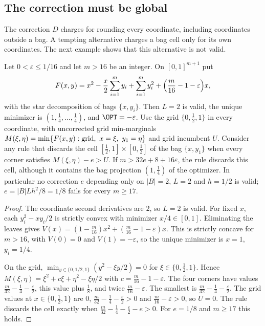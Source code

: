 \subsection{The correction must be global}\label{sec:limits-star}

The correction $D$ charges for rounding every coordinate, including
coordinates outside a bag. A tempting alternative charges a bag cell only for
its own coordinates. The next example shows that this alternative is not
valid.

\begin{proposition}\label{lim:prop:star}
Let $0<\varepsilon\le1/16$ and let $m>16$ be an integer. On $[0,1]^{m+1}$
put
\[
F(x,y)=x^2-\frac x2\sum_{i=1}^my_i+\sum_{i=1}^my_i^2
+\Bigl(\frac m{16}-1-\varepsilon\Bigr)x,
\]
with the star decomposition of bags $\{x,y_i\}$. Then $L=2$ is valid, the
unique minimizer is $(1,\tfrac14,\ldots,\tfrac14)$, and $\OPT=-\varepsilon$.
Use the grid $\{0,\tfrac12,1\}$ in every coordinate, with uncorrected grid
min-marginals
$M(\xi,\eta)=\min\{F(x,y):\hbox{grid},\ x=\xi,\ y_1=\eta\}$ and grid
incumbent $U$. Consider any rule that discards the cell
$[\tfrac12,1]\times[0,\tfrac12]$ of the bag $\{x,y_1\}$ when every corner
satisfies $M(\xi,\eta)-e>U$. If $m>32e+8+16\varepsilon$, the rule discards
this cell, although it contains the bag projection $(1,\tfrac14)$ of the
optimizer. In particular no correction $e$ depending only on $|B|=2$,
$L=2$ and $h=1/2$ is valid; $e=|B|Lh^2/8=1/8$ fails for every $m\ge17$.
\end{proposition}

\begin{proof}
The coordinate second derivatives are $2$, so $L=2$ is valid. For fixed $x$,
each $y_i^2-xy_i/2$ is strictly convex with minimizer $x/4\in[0,1]$.
Eliminating the leaves gives $V(x)=(1-\frac m{16})x^2+(\frac m{16}-1-
\varepsilon)x$. This is strictly concave for $m>16$, with $V(0)=0$ and
$V(1)=-\varepsilon$, so the unique minimizer is $x=1$, $y_i=1/4$.

On the grid, $\min_{y\in\{0,1/2,1\}}(y^2-\xi y/2)=0$ for $\xi\in\{0,\tfrac12,
1\}$. Hence $M(\xi,\eta)=\xi^2+c\xi+\eta^2-\xi\eta/2$ with
$c=\frac m{16}-1-\varepsilon$. The four corners have values
$\frac m{32}-\frac14-\frac\varepsilon2$, this value plus $\frac18$, and twice
$\frac m{16}-\varepsilon$. The smallest is
$\frac m{32}-\frac14-\frac\varepsilon2$. The grid values at
$x\in\{0,\tfrac12,1\}$ are $0$,
$\frac m{32}-\frac14-\frac\varepsilon2>0$ and $\frac m{16}-\varepsilon>0$,
so $U=0$. The rule discards the cell exactly when
$\frac m{32}-\frac14-\frac\varepsilon2-e>0$. For $e=1/8$ and $m\ge17$ this
holds.
\end{proof}

